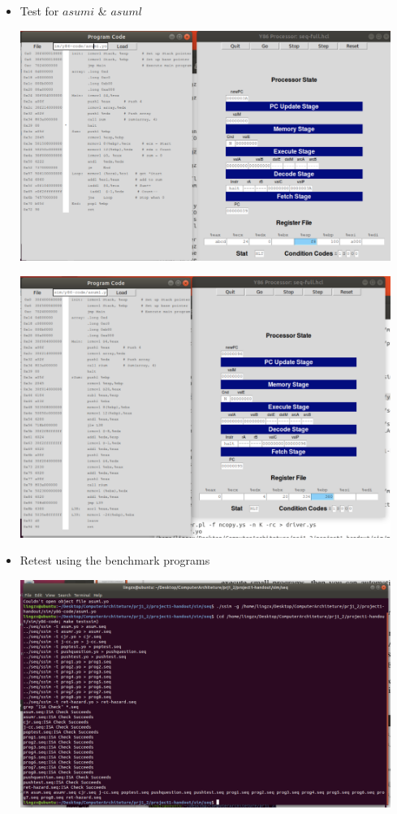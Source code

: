 \documentclass{article}
\begin{document}
\begin{itemize}
\item Test for $asumi$ \& $asuml$

\includegraphics[width=0.95\textwidth]{asumi.png}


\includegraphics[width=0.95\textwidth]{asuml.png}
\item Retest using the benchmark programs

\includegraphics[width=0.95\textwidth]{benchmark.png}


\end{itemize}
\end{document}
